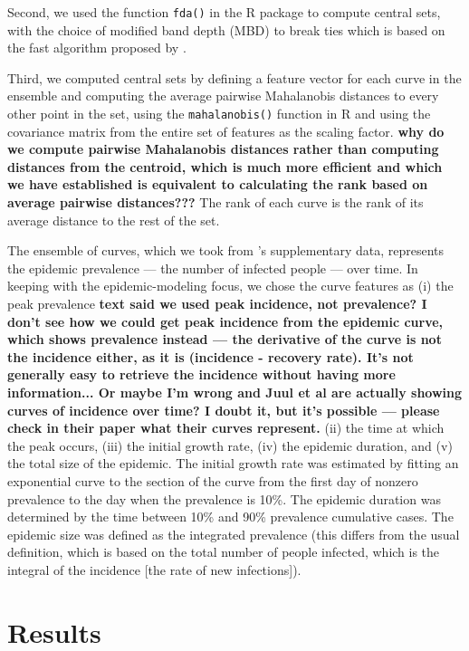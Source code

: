 \documentclass[fleqn,10pt,lineno]{wlpeerj}
\begin{document}
Second, we used the function {\tt fda()} in the R package  \citep{roahd} to compute central sets, with the choice of modified band depth (MBD) to break ties which is based on the fast algorithm proposed by \cite{sun2012exact}.

Third, we computed central sets by defining a feature vector for each curve in the ensemble and computing the average pairwise Mahalanobis distances to every other point in the set, using the {\tt mahalanobis()} function in R and using the covariance matrix from the entire  set of features as the scaling factor. \textbf{why do we compute pairwise Mahalanobis distances rather than computing distances from the centroid, which is much more efficient and which we have established is equivalent to calculating the rank based on average pairwise distances???} The rank of each curve is the rank of its average distance to the rest of the set.

The ensemble of curves, which we took from \cite{juul2021fixed}'s supplementary data, represents the epidemic prevalence --- the number of infected people --- over time.
In keeping with the epidemic-modeling focus, we chose the curve features as (i) the peak prevalence
\textbf{text said we used peak incidence, not prevalence? I don't see how we could get peak incidence from the epidemic curve, which shows prevalence instead --- the derivative of the curve is not the incidence either, as it is (incidence - recovery rate). It's not generally easy to retrieve the incidence without having more information... Or maybe I'm wrong and Juul et al are actually showing curves of incidence over time? I doubt it, but it's possible --- please check in their paper what their curves represent.}
(ii) the time at which the peak occurs, (iii) the initial growth rate, (iv) the epidemic duration, and (v) the total size of the epidemic. The initial growth rate was estimated by fitting an exponential curve to the section of the curve from the first day of nonzero prevalence to the day when the prevalence is 10\%. The epidemic duration was determined by the time between 10\% and 90\% prevalence cumulative cases. The epidemic size was defined as the integrated prevalence (this differs from the usual definition, which is based on the total number of people infected, which is the integral of the incidence [the rate of new infections]).


\section*{Results}
\end{document}
